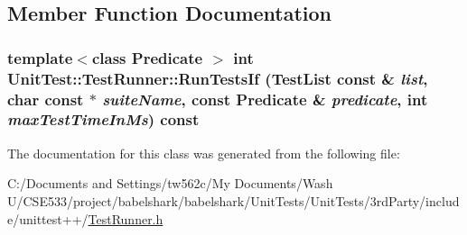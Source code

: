 \subsection{Member Function Documentation}
\hypertarget{class_unit_test_1_1_test_runner_d57c9afbdf7f12eaf6776b0c8e655157}{
\subsubsection[{RunTestsIf}]{\setlength{\rightskip}{0pt plus 5cm}template$<$class Predicate $>$ int UnitTest::TestRunner::RunTestsIf ({\bf TestList} const \& {\em list}, \/  char const $\ast$ {\em suiteName}, \/  const Predicate \& {\em predicate}, \/  int {\em maxTestTimeInMs}) const}}
\label{class_unit_test_1_1_test_runner_d57c9afbdf7f12eaf6776b0c8e655157}




The documentation for this class was generated from the following file:\begin{CompactItemize}
\item 
C:/Documents and Settings/tw562c/My Documents/Wash U/CSE533/project/babelshark/babelshark/UnitTests/UnitTests/3rdParty/include/unittest++/\hyperlink{_test_runner_8h}{TestRunner.h}\end{CompactItemize}

